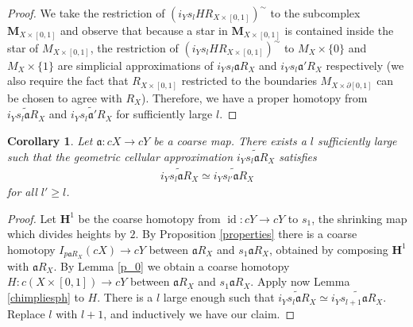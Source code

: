 \documentclass[a4paper,11pt]{article}
\theoremstyle{definition}
\theoremstyle{plain}
\newtheorem{cor}[definition]{Corollary}
\theoremstyle{remark}
\DeclareMathOperator{\id}{id}
\begin{document}
{\begin{proof}
We take the restriction of  $(i_{Y}s_{l}HR_{X\times [0,1]})^{\sim}$ to the subcomplex $\mathbf{M}_{X \times [0,1]}$ and observe that because a star in $\mathbf{M}_{X \times [0,1]}$ is contained inside the star of $M_{X\times [0,1]}$, the restriction of  $(i_{Y}s_{l}HR_{X\times [0,1]})^{\sim}$ to $M_{X} \times \{0\}$ and $M_{X} \times \{1\}$ are simplicial approximations of $i_{Y}s_{l}\mathfrak{a}R_{X}$ and $i_{Y}s_{l}\mathfrak{a}'R_{X}$ respectively (we also require the fact that $R_{X\times [0,1]}$ restricted to the boundaries $M_{X\times \partial [0,1]}$ can be chosen to agree with $R_{X}$). Therefore, we have a proper homotopy from $\widetilde{i_{Y}s_{l}\mathfrak{a}R_{X}}$ and $\widetilde{i_{Y}s_{l}\mathfrak{a}'R_{X}}$ for sufficiently large $l$. 
\end{proof}



\begin{cor} \label{lindep} Let $\mathfrak{a}: cX\rightarrow cY$ be a coarse map. There exists a $l$ sufficiently large such that the geometric cellular approximation $\widetilde{i_{Y}s_{l}\mathfrak{a}R_{X}}$ satisfies 
\begin{align*}
\widetilde{i_{Y}s_{l}\mathfrak{a}R_{X}} \simeq \widetilde{i_{Y}s_{l'}\mathfrak{a}R_{X}}
\end{align*} 
for all $l'\geq l$.
\end{cor}

\begin{proof} Let $\mathbf{H}^1$ be the coarse homotopy from $\id: cY\rightarrow cY$ to $s_1$, the shrinking map which divides heights by $2$. By Proposition \ref{properties} there is a coarse homotopy $I_{p\mathfrak{a}R_{X}}(cX) \rightarrow cY$ between $\mathfrak{a}R_{X}$ and $s_{1}\mathfrak{a}R_{X}$, obtained by composing $\mathbf{H}^1$ with $\mathfrak{a}R_{X}$. By Lemma \ref{p_0} we obtain a coarse homotopy $H: c(X \times [0,1]) \rightarrow cY$ between $\mathfrak{a}R_{X}$ and $s_{1}\mathfrak{a}R_{X}$. Apply now Lemma \ref{chimpliesph} to $H$. There is a $l$ large enough such that $\widetilde{i_{Y}s_{l}\mathfrak{a}R_{X}} \simeq \widetilde{i_{Y}s_{l+1}\mathfrak{a}R_{X}}$. Replace $l$ with $l+1$, and inductively we have our claim. 
\end{proof}



}
\end{document}
